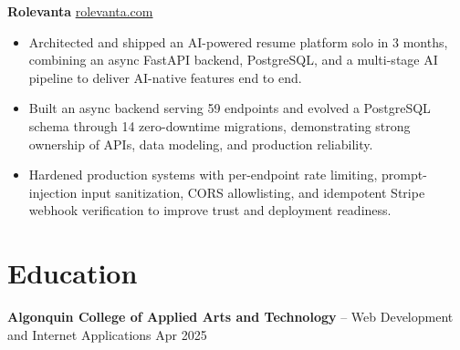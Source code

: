 \documentclass[11pt]{article}       %
\begin{document}
\textbf{Rolevanta} \hfill \href{https://rolevanta.com}{rolevanta.com} \\
\vspace{-9pt}
\begin{itemize}
  \item Architected and shipped an AI-powered resume platform solo in 3 months, combining an async FastAPI backend, PostgreSQL, and a multi-stage AI pipeline to deliver AI-native features end to end.
  \item Built an async backend serving 59 endpoints and evolved a PostgreSQL schema through 14 zero-downtime migrations, demonstrating strong ownership of APIs, data modeling, and production reliability.
  \item Hardened production systems with per-endpoint rate limiting, prompt-injection input sanitization, CORS allowlisting, and idempotent Stripe webhook verification to improve trust and deployment readiness.
\end{itemize}





\section*{Education}
\textbf{Algonquin College of Applied Arts and Technology} -- Web Development and Internet Applications
\hfill Apr 2025 \\
\end{document}
